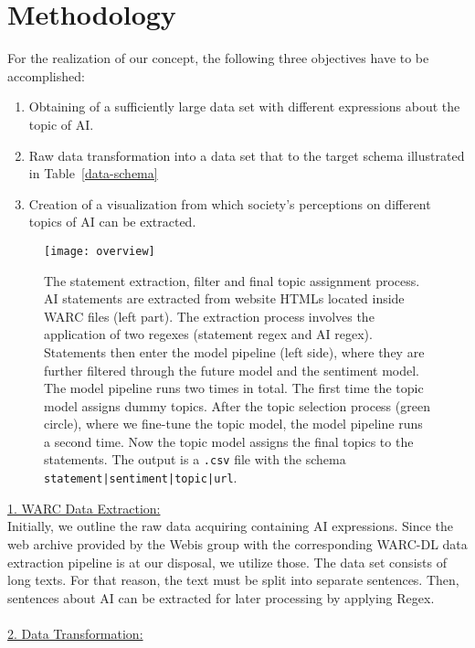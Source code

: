 \section{Methodology}

For the realization of our concept, the following three objectives have to be accomplished:

\begin{enumerate}
    \item Obtaining of a sufficiently large data set with different expressions about the topic of AI.
    \item Raw data transformation into a data set that to the target schema illustrated in Table~\ref{data-schema}
    \item Creation of a visualization from which society's perceptions on different topics of AI can be extracted.
\end{enumerate}%
%
%
\begin{figure}[t]
    \centering
    \texttt{[image: overview]}
    \caption{
        The statement extraction, filter and final topic assignment process.
        AI statements are extracted from website HTMLs located inside WARC files (left part).
        The extraction process involves the application of two regexes (statement regex and AI regex).
        Statements then enter the model pipeline (left side), where they are further filtered through the future model and the sentiment model.
        The model pipeline runs two times in total. The first time the topic model assigns dummy topics.
        After the topic selection process (green circle), where we fine-tune the topic model, the model pipeline runs a second time.
        Now the topic model assigns the final topics to the statements.
        The output is a \texttt{.csv} file with the schema \texttt{statement|sentiment|topic|url}.
    }
    \label{fig:overview}
\end{figure}
\underline{1. WARC Data Extraction:}
\\
Initially, we outline the raw data acquiring containing AI expressions.
Since the web archive provided by the Webis group with the corresponding WARC-DL data extraction pipeline \citep{Deckers2022} is at our disposal, we utilize those.
The data set consists of long texts.
For that reason, the text must be split into separate sentences.
Then, sentences about AI can be extracted for later processing by applying Regex.
\\
\\
%
\underline{2. Data Transformation:}
\\
